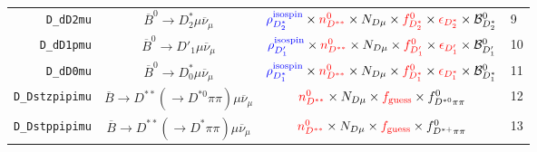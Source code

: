 \begin{landscape}
\begin{table}
\begin{tabular}{r|c|c|l}
        \texttt{D\_dD2mu} &              $\overline{B}^0 \rightarrow D^*_2 \mu \overline{\nu}_\mu$               &                                                                                  $\textcolor{blue}{\rho^\text{isospin}_{D_2^*}} \times \textcolor{red}{n^{0}_{D^{**}}} \times N_{D \mu} \times \textcolor{red}{f^{0}_{D_2^*}} \times \textcolor{red}{\epsilon_{D_2^*}} \times \mathcal{B}^{0}_{D_2^*}$                                                                                   & 9                \\
       \texttt{D\_dD1pmu} &               $\overline{B}^0 \rightarrow D'_1 \mu \overline{\nu}_\mu$               &                                                                                    $\textcolor{blue}{\rho^\text{isospin}_{D'_1}} \times \textcolor{red}{n^{0}_{D^{**}}} \times N_{D \mu} \times \textcolor{red}{f^{0}_{D'_1}} \times \textcolor{red}{\epsilon_{D'_1}} \times \mathcal{B}^{0}_{D'_1}$                                                                                     & 10               \\
        \texttt{D\_dD0mu} &              $\overline{B}^0 \rightarrow D^*_0 \mu \overline{\nu}_\mu$               &                                                                                  $\textcolor{blue}{\rho^\text{isospin}_{D_1^*}} \times \textcolor{red}{n^{0}_{D^{**}}} \times N_{D \mu} \times \textcolor{red}{f^{0}_{D_1^*}} \times \textcolor{red}{\epsilon_{D_1^*}} \times \mathcal{B}^{0}_{D_1^*}$                                                                                   & 11               \\
   \texttt{D\_Dstzpipimu} & $\overline{B} \rightarrow D^{**} (\rightarrow D^{*0} \pi\pi) \mu \overline{\nu}_\mu$ &                                                                                                                                   $\textcolor{red}{n^{0}_{D^{**}}} \times N_{D \mu} \times \textcolor{red}{f_\text{guess}} \times f^0_{D^{*0}\pi\pi}$                                                                                                                                    & 12               \\
   \texttt{D\_Dstppipimu} &  $\overline{B} \rightarrow D^{**} (\rightarrow D^* \pi\pi) \mu \overline{\nu}_\mu$   &                                                                                                                                   $\textcolor{red}{n^{0}_{D^{**}}} \times N_{D \mu} \times \textcolor{red}{f_\text{guess}} \times f^0_{D^{*+}\pi\pi}$                                                                                                                                    & 13               \\

\end{tabular}
\end{table}
\end{landscape}
